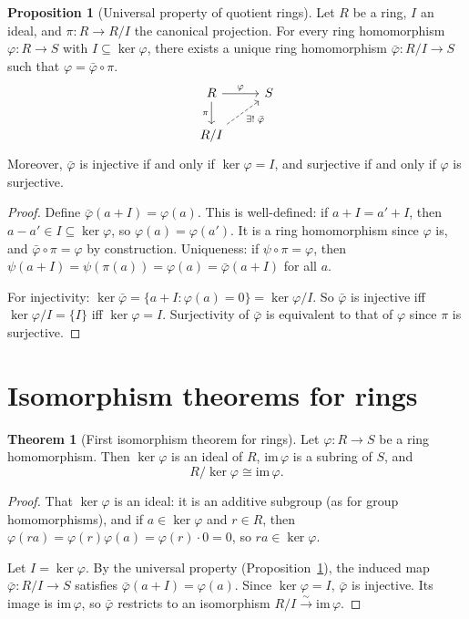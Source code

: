 \documentclass[12pt,a4paper,openany]{book}
\theoremstyle{definition}
\newtheorem{theorem}{Theorem}[chapter]
\newtheorem{proposition}{Proposition}[chapter]
\theoremstyle{remark}
\begin{document}
\begin{proposition}[Universal property of quotient rings]\label{prop:quotient-universal}
Let $R$ be a ring, $I$ an ideal, and $\pi\colon R\to R/I$ the canonical projection. For every ring homomorphism $\varphi\colon R\to S$ with $I\subseteq\ker\varphi$, there exists a unique ring homomorphism $\bar{\varphi}\colon R/I\to S$ such that $\varphi=\bar{\varphi}\circ\pi$.
\[
\begin{tikzcd}
    R \arrow[r, "\varphi"] \arrow[d, "\pi"'] & S \\
    R/I \arrow[ur, "\exists!\;\bar{\varphi}"', dashed] &
\end{tikzcd}
\]
Moreover, $\bar{\varphi}$ is injective if and only if $\ker\varphi=I$, and surjective if and only if $\varphi$ is surjective.
\end{proposition}

\begin{proof}
Define $\bar{\varphi}(a+I)=\varphi(a)$. This is well-defined: if $a+I=a'+I$, then $a-a'\in I\subseteq\ker\varphi$, so $\varphi(a)=\varphi(a')$. It is a ring homomorphism since $\varphi$ is, and $\bar{\varphi}\circ\pi=\varphi$ by construction. Uniqueness: if $\psi\circ\pi=\varphi$, then $\psi(a+I)=\psi(\pi(a))=\varphi(a)=\bar{\varphi}(a+I)$ for all $a$.

For injectivity: $\ker\bar{\varphi}=\{a+I : \varphi(a)=0\}=\ker\varphi/I$. So $\bar{\varphi}$ is injective iff $\ker\varphi/I=\{I\}$ iff $\ker\varphi=I$. Surjectivity of $\bar{\varphi}$ is equivalent to that of $\varphi$ since $\pi$ is surjective.
\end{proof}

\section{Isomorphism theorems for rings}\label{sec:ring-isom-thms}

\begin{theorem}[First isomorphism theorem for rings]\label{thm:ring-first-isom}
Let $\varphi\colon R\to S$ be a ring homomorphism. Then $\ker\varphi$ is an ideal of $R$, $\mathrm{im}\,\varphi$ is a subring of $S$, and
\[
    R/\ker\varphi \cong \mathrm{im}\,\varphi.
\]
\end{theorem}

\begin{proof}
That $\ker\varphi$ is an ideal: it is an additive subgroup (as for group homomorphisms), and if $a\in\ker\varphi$ and $r\in R$, then $\varphi(ra)=\varphi(r)\varphi(a)=\varphi(r)\cdot 0=0$, so $ra\in\ker\varphi$.

Let $I=\ker\varphi$. By the universal property (Proposition~\ref{prop:quotient-universal}), the induced map $\bar{\varphi}\colon R/I\to S$ satisfies $\bar{\varphi}(a+I)=\varphi(a)$. Since $\ker\varphi=I$, $\bar{\varphi}$ is injective. Its image is $\mathrm{im}\,\varphi$, so $\bar{\varphi}$ restricts to an isomorphism $R/I\xrightarrow{\sim}\mathrm{im}\,\varphi$.
\end{proof}
\end{document}
